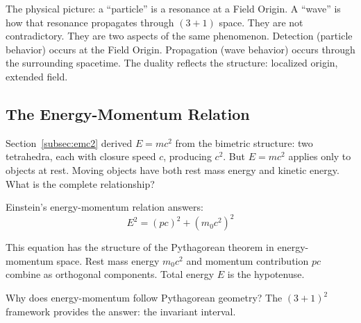 \documentclass[aps,prd,preprint,superscriptaddress,showpacs,preprintnumbers,amsmath,amssymb,nofootinbib]{revtex4-2}
\begin{document}
The physical picture: a ``particle'' is a resonance at a Field Origin. A ``wave'' is how that resonance propagates through $(3+1)$ space. They are not contradictory. They are two aspects of the same phenomenon. Detection (particle behavior) occurs at the Field Origin. Propagation (wave behavior) occurs through the surrounding spacetime. The duality reflects the structure: localized origin, extended field.

\subsection{The Energy-Momentum Relation}
\label{subsec:energy-momentum}

Section~\ref{subsec:emc2} derived $E = mc^2$ from the bimetric structure: two tetrahedra, each with closure speed $c$, producing $c^2$. But $E = mc^2$ applies only to objects at rest. Moving objects have both rest mass energy and kinetic energy. What is the complete relationship?

Einstein's energy-momentum relation answers:
\begin{equation}
E^2 = (pc)^2 + (m_0 c^2)^2
\end{equation}

This equation has the structure of the Pythagorean theorem in energy-momentum space. Rest mass energy $m_0 c^2$ and momentum contribution $pc$ combine as orthogonal components. Total energy $E$ is the hypotenuse.

Why does energy-momentum follow Pythagorean geometry? The $(3+1)^2$ framework provides the answer: the invariant interval.

\vspace{1em}
\noindent
{}
\vspace{1cm}
\end{document}

